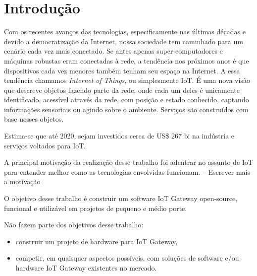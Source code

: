 \section*{Introdução}
\label{sec:intro}

Com os recentes avanços das tecnologias, especificamente nas últimas décadas e devido a democratização da Internet, nossa sociedade tem caminhado para um cenário cada vez mais conectado. Se antes apenas super-computadores e máquinas robustas eram conectadas à rede, a tendência nos próximos anos é que dispositivos cada vez menores também tenham seu espaço na Internet.
A essa tendência chamamos \textit{Internet of Things}, ou simplesmente IoT. É uma nova visão que descreve objetos fazendo parte da rede, onde cada um deles é unicamente identificado, acessível através da rede, com posição e estado conhecido, captando informações sensoriais ou agindo sobre o ambiente. Serviços são construídos com base nesses objetos.

Estima-se que até 2020, sejam investidos cerca de US\$ 267 bi na indústria e serviços voltados para IoT. \cite{BCGPerspectives} \cite{Forbes}

A principal motivação da realização desse trabalho foi adentrar no assunto de IoT para entender melhor como as tecnologias envolvidas funcionam.
-- Escrever mais a motivação

O objetivo desse trabalho é construir um software IoT Gateway open-source, funcional e utilizável em projetos de pequeno e médio porte.

Não fazem parte dos objetivos desse trabalho:

\begin{itemize}
	\item construir um projeto de hardware para IoT Gateway,
	\item competir, em quaisquer aspectos possíveis, com soluções de software e/ou hardware IoT Gateway existentes no mercado.
\end{itemize} 

